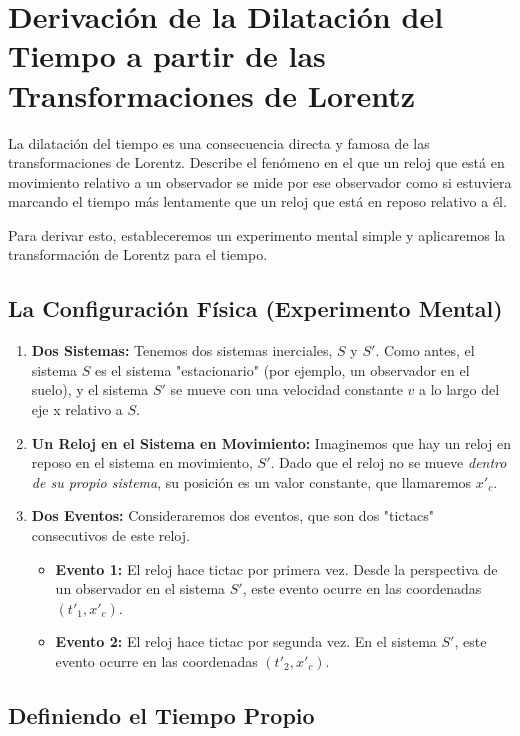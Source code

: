 \documentclass[11pt,a4paper]{article}
\begin{document}
\section{Derivación de la Dilatación del Tiempo a partir de las Transformaciones de Lorentz}

La dilatación del tiempo es una consecuencia directa y famosa de las transformaciones de Lorentz. Describe el fenómeno en el que un reloj que está en movimiento relativo a un observador se mide por ese observador como si estuviera marcando el tiempo más lentamente que un reloj que está en reposo relativo a él.

Para derivar esto, estableceremos un experimento mental simple y aplicaremos la transformación de Lorentz para el tiempo.

\subsection{La Configuración Física (Experimento Mental)}

\begin{enumerate}
    \item \textbf{Dos Sistemas:} Tenemos dos sistemas inerciales, $S$ y $S'$. Como antes, el sistema $S$ es el sistema "estacionario" (por ejemplo, un observador en el suelo), y el sistema $S'$ se mueve con una velocidad constante $v$ a lo largo del eje x relativo a $S$.

    \item \textbf{Un Reloj en el Sistema en Movimiento:} Imaginemos que hay un reloj en reposo en el sistema en movimiento, $S'$. Dado que el reloj no se mueve \textit{dentro de su propio sistema}, su posición es un valor constante, que llamaremos $x'_c$.

    \item \textbf{Dos Eventos:} Consideraremos dos eventos, que son dos "tictacs" consecutivos de este reloj.
    \begin{itemize}
        \item \textbf{Evento 1:} El reloj hace tictac por primera vez. Desde la perspectiva de un observador en el sistema $S'$, este evento ocurre en las coordenadas $(t'_1, x'_c)$.
        \item \textbf{Evento 2:} El reloj hace tictac por segunda vez. En el sistema $S'$, este evento ocurre en las coordenadas $(t'_2, x'_c)$.
    \end{itemize}
\end{enumerate}

\subsection{Definiendo el Tiempo Propio}
\end{document}
